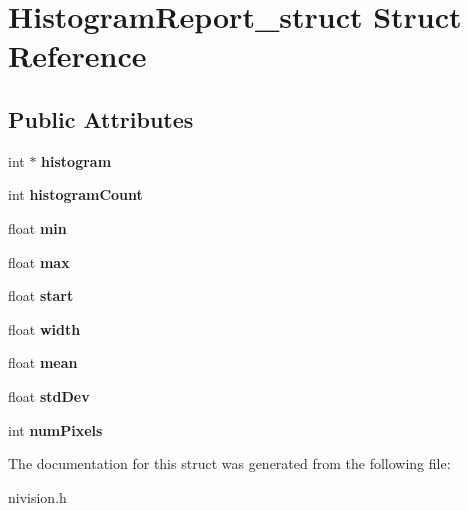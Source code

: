 \hypertarget{structHistogramReport__struct}{
\section{HistogramReport\_\-struct Struct Reference}
\label{structHistogramReport__struct}
}
\subsection*{Public Attributes}
\begin{DoxyCompactItemize}
\item 
\hypertarget{structHistogramReport__struct_ae2a4bf5d013fd23c97f233f84931e893}{
int $\ast$ {\bfseries histogram}}
\label{structHistogramReport__struct_ae2a4bf5d013fd23c97f233f84931e893}

\item 
\hypertarget{structHistogramReport__struct_ace3f10c53c0849be0325f1d0f49c5cc6}{
int {\bfseries histogramCount}}
\label{structHistogramReport__struct_ace3f10c53c0849be0325f1d0f49c5cc6}

\item 
\hypertarget{structHistogramReport__struct_a84095698e5025567b7ead3f24aaa4609}{
float {\bfseries min}}
\label{structHistogramReport__struct_a84095698e5025567b7ead3f24aaa4609}

\item 
\hypertarget{structHistogramReport__struct_ad191015ac357d25c621ccd55dc9d6fdf}{
float {\bfseries max}}
\label{structHistogramReport__struct_ad191015ac357d25c621ccd55dc9d6fdf}

\item 
\hypertarget{structHistogramReport__struct_a430a855ce6a66cdc970ba492fbdf628f}{
float {\bfseries start}}
\label{structHistogramReport__struct_a430a855ce6a66cdc970ba492fbdf628f}

\item 
\hypertarget{structHistogramReport__struct_af360a28be8c996e2a604951a96001639}{
float {\bfseries width}}
\label{structHistogramReport__struct_af360a28be8c996e2a604951a96001639}

\item 
\hypertarget{structHistogramReport__struct_a25e94f1123c2ca708dbbe0f60cc82c16}{
float {\bfseries mean}}
\label{structHistogramReport__struct_a25e94f1123c2ca708dbbe0f60cc82c16}

\item 
\hypertarget{structHistogramReport__struct_a21713b863832a106b287fa38ab9b4d9e}{
float {\bfseries stdDev}}
\label{structHistogramReport__struct_a21713b863832a106b287fa38ab9b4d9e}

\item 
\hypertarget{structHistogramReport__struct_a37769eeb9ea1153271817e5bc4b942c3}{
int {\bfseries numPixels}}
\label{structHistogramReport__struct_a37769eeb9ea1153271817e5bc4b942c3}

\end{DoxyCompactItemize}


The documentation for this struct was generated from the following file:\begin{DoxyCompactItemize}
\item 
nivision.h\end{DoxyCompactItemize}
